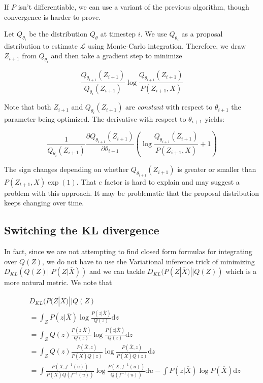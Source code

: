 \documentclass{article}
\begin{document}
If \(P\) isn't differentiable, we can use a variant of the previous algorithm,
though convergence is harder to prove.

Let \(Q_{\theta_i}\) be the distribution \(Q_{\theta}\) at timestep \(i\).
We use \(Q_{\theta_i}\) as a proposal distribution to estimate \(\mathcal{L}\)
using Monte-Carlo integration. Therefore, we draw \(Z_{i+1}\) from
\(Q_{\theta_i}\) and then take a gradient step to minimize

\[
  \frac{Q_{\theta_{i+1}}(Z_{i+1})}{Q_{\theta_i}(Z_{i+1})} \log
  \frac{Q_{\theta_{i+1}}(Z_{i+1})}{P(Z_{i+1},X)}
\]

Note that both \(Z_{i+1}\) and \(Q_{\theta_i}(Z_{i+1})\) are \emph{constant}
with respect to \(\theta_{i+1}\) the parameter being optimized. The derivative
with respect to \(\theta_{i+1}\) yields:

\[
  \frac{1}{Q_{\theta_i}(Z_{i+1})}
    \frac{\partial Q_{\theta_{i+1}}(Z_{i+1})}{\partial \theta_{i+1}}
    \left( \log \frac{Q_{\theta_{i+1}}(Z_{i+1})}{P(Z_{i+1},X)} + 1 \right)
\]

The sign changes depending on whether \(Q_{\theta_{i+1}}(Z_{i+1})\) is greater
or smaller than \(P(Z_{t+1},X) \exp(1)\). That \(e\) factor is hard to explain
and may suggest a problem with this approach. It may be problematic that
the proposal distribution keeps changing over time.

\subsection{Switching the KL divergence}

In fact, since we are not attempting to find closed form formulas for
integrating over \(Q(Z)\), we do not have to use the Variational inference
trick of minimizing \(D_{KL}(Q(Z)||P(Z|\overline{X}))\) and we can tackle
\(D_{KL}(P(Z|\overline{X})||Q(Z))\) which is a more natural metric. We note that

\[
\begin{aligned}
  & D_{KL}(P(Z|\overline{X})|| Q(Z) \\
  &= \int_Z P(z|\overline{X}) \log \frac{P(z|\overline{X})}{Q(z)} \mathrm{d}z \\
  &= \int_Z Q(z) \frac{P(z|\overline{X})}{Q(z)}
  \log \frac{P(z|\overline{X})}{Q(z)}  \mathrm{d}z \\
  &= \int_Z Q(z) \frac{P(\overline{X}, z)}{P(\overline{X})Q(z)}
  \log \frac{P(\overline{X}, z)}{P(\overline{X})Q(z)}  \mathrm{d}z \\
  &= \int\frac{P(\overline{X}, f^{-1}(u))}{
    P(\overline{X})Q(f^{-1}(u))}
  \log \frac{P(\overline{X}, f^{-1}(u))}{Q(f^{-1}(u))}  \mathrm{d}u
  - \int P(z|\overline{X}) \log P(\overline{X})  \mathrm{d}z
\end{aligned}
\]
\end{document}
